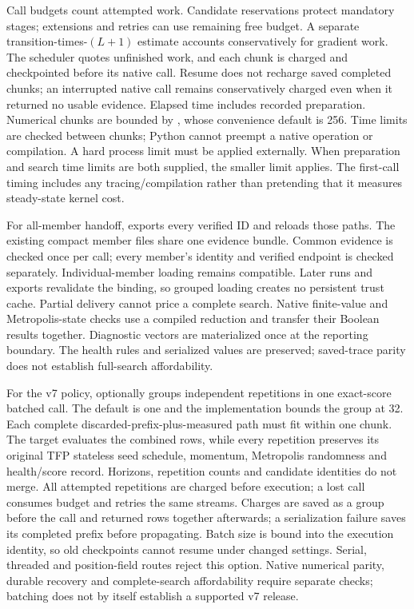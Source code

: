 Call budgets count attempted work. Candidate reservations protect mandatory
stages; extensions and retries can use remaining free budget. A separate
transition-times-$(L+1)$ estimate accounts conservatively for gradient work.
The scheduler quotes unfinished work, and each chunk is charged and checkpointed
before its native call. Resume does not recharge saved completed chunks; an
interrupted native call remains conservatively charged even when it returned
no usable evidence. Elapsed time includes recorded preparation. Numerical chunks are bounded
by , whose convenience default is 256. Time limits are
checked between chunks; Python cannot preempt a native operation or compilation.
A hard process limit must be applied externally. When preparation and search
time limits are both supplied, the smaller limit applies.
The first-call timing includes any tracing/compilation rather than pretending
that it measures steady-state kernel cost.

For all-member handoff,  exports
every verified ID and  reloads those
paths. The existing compact member files share one evidence bundle. Common
evidence is checked once per call; every member's identity and verified endpoint
is checked separately. Individual-member loading remains compatible. Later
runs and exports revalidate the binding, so grouped loading creates no persistent
trust cache. Partial delivery cannot price a complete search.
Native finite-value and Metropolis-state checks use a compiled reduction and
transfer their Boolean results together. Diagnostic vectors are materialized
once at the reporting boundary. The health rules and serialized values are
preserved; saved-trace parity does not establish full-search affordability.

For the v7 policy, 
optionally groups independent repetitions in one exact-score batched call.
The default is one and the implementation bounds the group at 32. Each complete
discarded-prefix-plus-measured path must fit within one chunk. The target
evaluates the combined rows, while every repetition preserves its original
TFP stateless seed schedule, momentum, Metropolis randomness and health/score
record. Horizons, repetition counts and candidate identities do not merge.
All attempted repetitions are charged before execution; a lost call consumes
budget and retries the same streams. Charges are saved as a group before the
call and returned rows together afterwards; a serialization failure saves its
completed prefix before propagating. Batch size is bound into the execution
identity, so old checkpoints cannot resume under changed settings. Serial,
threaded and position-field routes reject this option. Native numerical parity,
durable recovery and complete-search affordability require separate checks;
batching does not by itself establish a supported v7 release.

